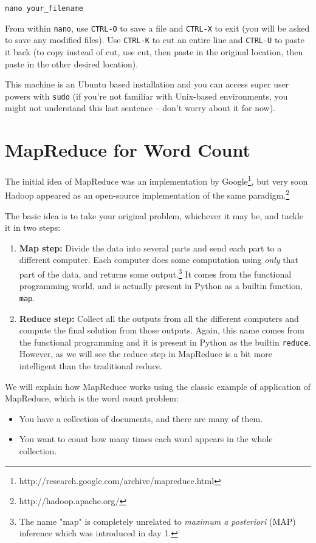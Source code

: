 \begin{verbatim}
nano your_filename
\end{verbatim}

From within \texttt{nano}, use \texttt{CTRL-O} to save a file and \texttt{CTRL-X} to exit (you will be asked to save any modified files). Use \texttt{CTRL-K} to cut an entire line and \texttt{CTRL-U} to paste it back (to copy instead of cut, use cut, then paste in the original location, then paste in the other desired location).

This machine is an Ubuntu based
installation and you can access super user powers with \texttt{sudo} (if you're
not familiar with Unix-based environments, you might not understand this last
sentence -- don't worry about it for now).
\fi

\section{MapReduce for Word Count}

The initial idea of MapReduce was an implementation by
Google\footnote{http://research.google.com/archive/mapreduce.html}, but very soon Hadoop appeared as an open-source implementation of the same paradigm.\footnote{http://hadoop.apache.org/}

The basic idea is to take your original problem, whichever it may be, and tackle it in two steps:
%
\begin{enumerate}
\item \textbf{Map step:} Divide the data into several parts and send each part to a different computer. Each computer does some computation using \emph{only} that part of the data, and returns some output.\footnote{The name "map" is completely unrelated to \emph{maximum a posteriori} (MAP) inference which was introduced in day 1.} It comes from the functional programming world, and is actually present in Python as a builtin function, \verb+map+.
\item \textbf{Reduce step:} Collect all the outputs from all the different computers and compute the final solution from those outputs. Again, this name comes from the functional programming and it is present in Python as the builtin \verb+reduce+. However, as we will see the reduce step in MapReduce is a bit
more intelligent than the traditional reduce.
\end{enumerate}

We will explain how MapReduce works using the classic example of application of MapReduce, which is the word count problem:
%
\begin{itemize}
\item You have a collection of documents, and there are many of them.
\item You want to count how many times each word appears in the whole collection.
\end{itemize}

